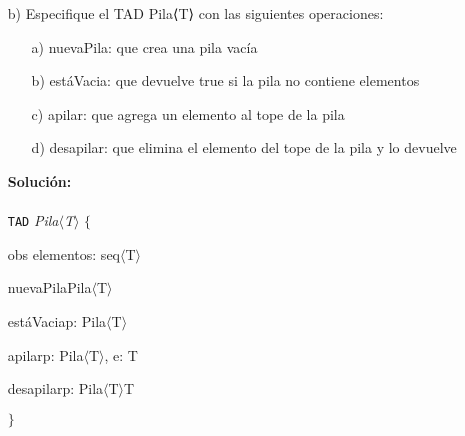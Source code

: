 \documentclass{article}
\newenvironment{tad}[1]{
	\paragraph{} \vspace*{-4mm}
	\newcommand{\obs}[2]{\texttt{obs} ##1 : ##2}

	\vspace{1ex}
	\texttt{TAD} \textit{#1} $\{$
	\par
	\tocarEspacios
}
{

\hspace{2.5mm} $\}$
\vspace{2ex}
}
\begin{document}
\begin{itemize}
    \item [b)] Especifique el TAD Pila⟨T⟩ con las siguientes operaciones:
    \begin{itemize}
        \item [a)] nuevaPila: que crea una pila vac\'ia
        \item [b)] est\'aVacia: que devuelve true si la pila no contiene elementos
        \item [c)] apilar: que agrega un elemento al tope de la pila
        \item [d)] desapilar: que elimina el elemento del tope de la pila y lo devuelve
    \end{itemize}
    \textbf{Soluci\'on:}
    \begin{tad}{Pila$\langle$T$\rangle$}
        obs elementos: seq$\langle$T$\rangle$

        \begin{proc}{nuevaPila}{}{Pila$\langle$T$\rangle$}
        \end{proc}

        \begin{proc}{est\'aVacia}{\In p: Pila$\langle$T$\rangle$}{\bool}
        \end{proc}

        \begin{proc}{apilar}{\Inout p: Pila$\langle$T$\rangle$, \In e: T}{}
        \end{proc}

        \begin{proc}{desapilar}{\Inout p: Pila$\langle$T$\rangle$}{T}
        \end{proc}
        
    \end{tad}


\end{itemize}
\end{document}
